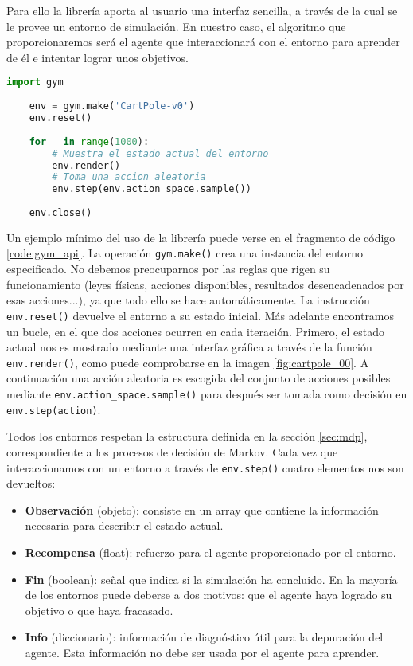 Para ello la librería aporta al usuario una interfaz sencilla, a través de la cual se le provee un entorno de simulación. En nuestro caso, el algoritmo que proporcionaremos será el agente que interaccionará con el entorno para aprender de él e intentar lograr unos objetivos.

\begin{minipage}{0.9\linewidth}%
    \begin{lstlisting}[frame=tb, language=Python, caption=Creación y renderizado del entorno CartPole, label=code:gym_api]
    import gym
    
    env = gym.make('CartPole-v0')
    env.reset()
    
    for _ in range(1000):
        # Muestra el estado actual del entorno
        env.render()
        # Toma una accion aleatoria
        env.step(env.action_space.sample())
    
    env.close()
    \end{lstlisting}%
\end{minipage}

Un ejemplo mínimo del uso de la librería puede verse en el fragmento de código \ref{code:gym_api}. La operación \texttt{gym.make()} crea una instancia del entorno especificado. No debemos preocuparnos por las reglas que rigen su funcionamiento (leyes físicas, acciones disponibles, resultados desencadenados por esas acciones...), ya que todo ello se hace automáticamente. La instrucción \texttt{env.reset()} devuelve el entorno a su estado inicial. Más adelante encontramos un bucle, en el que dos acciones ocurren en cada iteración. Primero, el estado actual nos es mostrado mediante una interfaz gráfica a través de la función \texttt{env.render()}, como puede comprobarse en la imagen \ref{fig:cartpole_00}. A continuación una acción aleatoria es escogida del conjunto de acciones posibles mediante \texttt{env.action\_space.sample()} para después ser tomada como decisión en \texttt{env.step(action)}.

Todos los entornos respetan la estructura definida en la sección \ref{sec:mdp}, correspondiente a los procesos de decisión de Markov. Cada vez que interaccionamos con un entorno a través de \texttt{env.step()} cuatro elementos nos son devueltos:
\begin{itemize}
    \item \textbf{Observación} (objeto): consiste en un array que contiene la información necesaria para describir el estado actual.
    \item \textbf{Recompensa} (float): refuerzo para el agente proporcionado por el entorno.
    \item \textbf{Fin} (boolean): señal que indica si la simulación ha concluido. En la mayoría de los entornos puede deberse a dos motivos: que el agente haya logrado su objetivo o que haya fracasado.
    \item \textbf{Info} (diccionario): información de diagnóstico útil para la depuración del agente. Esta información no debe ser usada por el agente para aprender.
\end{itemize}

